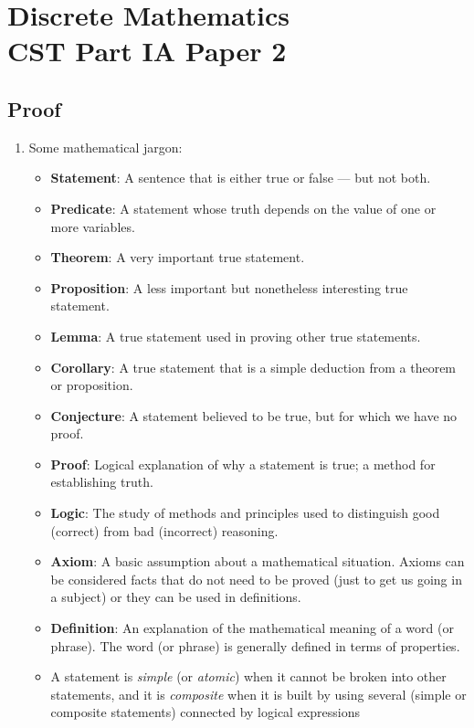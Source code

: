 \documentclass{article}
\author{Victor Zhao\\xz398@cam.ac.uk}
\begin{document}
\centering
\section*{Discrete Mathematics\\CST Part IA Paper 2}
\MyAuthor

\justifying
\subsection{Proof}
\begin{enumerate}
    \item Some mathematical jargon:
        \begin{itemize}[topsep=0pt]
            \item \textbf{Statement}: A sentence that is either true or false — but not both. 
            \item \textbf{Predicate}: A statement whose truth depends on the value of one or more variables.
            \item \textbf{Theorem}: A very important true statement.
            \item \textbf{Proposition}: A less important but nonetheless interesting true statement.
            \item \textbf{Lemma}: A true statement used in proving other true statements.
            \item \textbf{Corollary}: A true statement that is a simple deduction from a theorem or proposition.
            \item \textbf{Conjecture}: A statement believed to be true, but for which we have no proof.
            \item \textbf{Proof}: Logical explanation of why a statement is true; a method for establishing truth.
            \item \textbf{Logic}: The study of methods and principles used to distinguish good (correct) from bad (incorrect) reasoning.
            \item \textbf{Axiom}: A basic assumption about a mathematical situation. Axioms can be considered facts that do not need to be proved (just to get us going in a subject) or they can be used in definitions.
            \item \textbf{Definition}: An explanation of the mathematical meaning of a word (or phrase). The word (or phrase) is generally defined in terms of properties.
            \item A statement is \textit{simple} (or \textit{atomic}) when it cannot be broken into other statements, and it is \textit{composite} when it is built by using several (simple or composite statements) connected by logical expressions

\end{itemize}
\end{enumerate}
\end{document}
